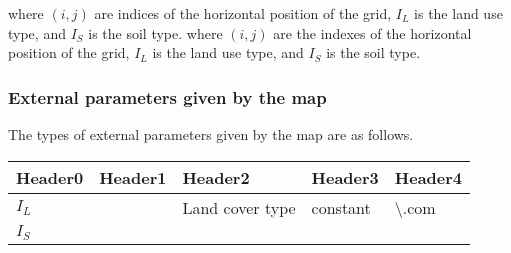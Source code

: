 where \((i,j)\) are indices of the horizontal position of the grid,
\(I_L\) is the land use type, and \(I_S\) is the soil type. where
\((i,j)\) are the indexes of the horizontal position of the grid,
\(I_L\) is the land use type, and \(I_S\) is the soil type.

\hypertarget{external-parameters-given-by-the-map}{%
\subsubsection{External parameters given by the
map}\label{external-parameters-given-by-the-map}}

The types of external parameters given by the map are as follows.

\begin{longtable}[]{@{}lllll@{}}
\toprule
\begin{minipage}[b]{0.17\columnwidth}\raggedright
Header0\strut
\end{minipage} & \begin{minipage}[b]{0.17\columnwidth}\raggedright
Header1\strut
\end{minipage} & \begin{minipage}[b]{0.17\columnwidth}\raggedright
Header2\strut
\end{minipage} & \begin{minipage}[b]{0.17\columnwidth}\raggedright
Header3\strut
\end{minipage} & \begin{minipage}[b]{0.17\columnwidth}\raggedright
Header4\strut
\end{minipage}\tabularnewline
\midrule
\endhead
\begin{minipage}[t]{0.17\columnwidth}\raggedright
\(I_L\)\strut
\end{minipage} & \begin{minipage}[t]{0.17\columnwidth}\raggedright
\strut
\end{minipage} & \begin{minipage}[t]{0.17\columnwidth}\raggedright
Land cover type\strut
\end{minipage} & \begin{minipage}[t]{0.17\columnwidth}\raggedright
constant\strut
\end{minipage} & \begin{minipage}[t]{0.17\columnwidth}\raggedright
\textbackslash.com\strut
\end{minipage}\tabularnewline
\begin{minipage}[t]{0.17\columnwidth}\raggedright
\(I_S\)\strut

\end{minipage}
\end{longtable}
